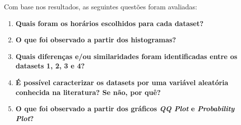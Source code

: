 Com base nos resultados, as seguintes questões foram avaliadas:
\begin{enumerate}
    \item \textbf{Quais foram os horários escolhidos para cada dataset?}
    \item \textbf{O que foi observado a partir dos histogramas?}
    \item \textbf{Quais diferenças e/ou similaridades foram identificadas entre os datasets 1, 2, 3 e 4?}
    \item \textbf{É possível caracterizar os datasets por uma variável aleatória conhecida na literatura? Se não, por quê?}
    \item \textbf{O que foi observado a partir dos gráficos \textit{QQ Plot} e \textit{Probability Plot}?}
\end{enumerate}

